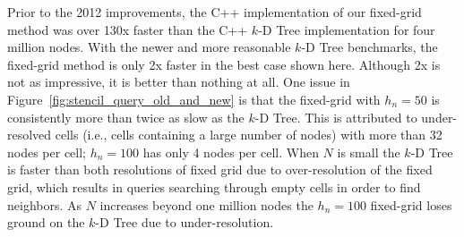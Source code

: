 \documentclass{report}
\begin{document}
Prior to the 2012 improvements, the C++ implementation of our fixed-grid method was over 130x faster than the C++ $k$-D Tree implementation for four million nodes. With the newer and more reasonable $k$-D Tree benchmarks, the fixed-grid method is only 2x faster in the best case shown here. Although 2x is not as impressive, it is better than nothing at all. One issue in Figure~\ref{fig:stencil_query_old_and_new} is that the fixed-grid with $h_n=50$ is consistently more than twice as slow as the $k$-D Tree. This is attributed to under-resolved cells (i.e., cells containing a large number of nodes) with more than 32 nodes per cell; $h_n=100$ has only 4 nodes per cell. When $N$ is small the $k$-D Tree is faster than both resolutions of fixed grid due to over-resolution of the fixed grid, which results in queries searching through empty cells in order to find neighbors. As $N$ increases beyond one million nodes the $h_n=100$ fixed-grid loses ground on the $k$-D Tree due to under-resolution. 
\end{document}
